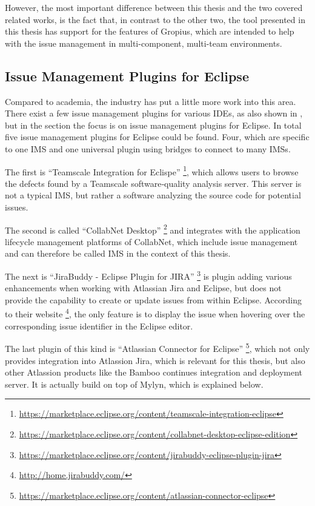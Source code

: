 However, the most important difference between this thesis and the two covered related works,
is the fact that, in contrast to the other two, the tool presented in this thesis has support for the features of \gls{Gropius},
which are intended to help with the issue management in multi-component, multi-team environments.


\subsection{Issue Management Plugins for Eclipse}
\label{ssec:ch2:ss2.3}
Compared to academia, the industry has put a little more work into this area.
There exist a few issue management plugins for various \glspl{IDE}, as also shown in \cite{janak2009issue}, 
but in the section the focus is on issue management plugins for \gls{Eclipse}.
In total five issue management plugins for \gls{Eclipse} could be found.
Four, which are specific to one \gls{IMS} and one universal plugin using bridges to connect to many \glspl{IMS}.

The first is ``Teamscale Integration for Eclispe'' \footnote{\url{https://marketplace.eclipse.org/content/teamscale-integration-eclipse}}, 
which allows users to browse the defects found by a Teamscale software‐quality analysis server.
This server is not a typical \gls{IMS}, but rather a software analyzing the source code for potential issues.

The second is called ``CollabNet Desktop'' \footnote{\url{https://marketplace.eclipse.org/content/collabnet-desktop-eclipse-edition}} and 
integrates with the application lifecycle management platforms of CollabNet, which include issue management and can therefore be called \gls{IMS} in the context of this thesis.

The next is ``JiraBuddy - Eclipse Plugin for JIRA'' \footnote{\url{https://marketplace.eclipse.org/content/jirabuddy-eclipse-plugin-jira}}
is plugin adding various enhancements when working with Atlassian Jira and \gls{Eclipse}, but does not provide the capability to create or update 
issues from within \gls{Eclipse}. According to their website \footnote{\url{http://home.jirabuddy.com/}}, the only feature is to display the issue when hovering over the corresponding issue identifier in the \gls{Eclipse} editor.

The last plugin of this kind is ``Atlassian Connector for Eclipse'' \footnote{\url{https://marketplace.eclipse.org/content/atlassian-connector-eclipse}},
which not only provides integration into Atlassion Jira, which is relevant for this thesis, but also other Atlassion products like the Bamboo continues integration and deployment server.
It is actually build on top of Mylyn, which is explained below.

